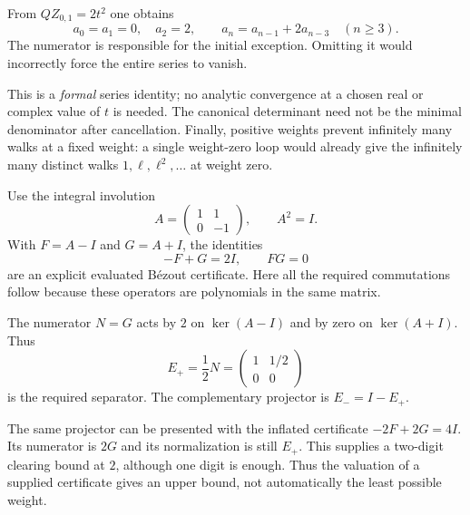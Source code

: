 
From $QZ_{0,1}=2t^2$ one obtains
\[
a_0=a_1=0,\quad a_2=2,\qquad a_n=a_{n-1}+2a_{n-3}\quad(n\ge3).
\]
The numerator is responsible for the initial exception. Omitting it would incorrectly force the entire series to vanish.

This is a \emph{formal} series identity; no analytic convergence at a chosen real or complex value of $t$ is needed. The canonical determinant need not be the minimal denominator after cancellation. Finally, positive weights prevent infinitely many walks at a fixed weight: a single weight-zero loop would already give the infinitely many distinct walks $1,\ell,\ell^2,\ldots$ at weight zero.


Use the integral involution
\[
A=\begin{pmatrix}1&1\\0&-1\end{pmatrix},\qquad A^2=I.
\]
With $F=A-I$ and $G=A+I$, the identities
\[
-F+G=2I,\qquad FG=0
\]
are an explicit evaluated B\'ezout certificate. Here all the required commutations follow because these operators are polynomials in the same matrix.


The numerator $N=G$ acts by $2$ on $\ker(A-I)$ and by zero on $\ker(A+I)$. Thus
\[
E_+=\frac12N
=\begin{pmatrix}1&1/2\\0&0\end{pmatrix}
\]
is the required separator. The complementary projector is $E_-=I-E_+$.

The same projector can be presented with the inflated certificate $-2F+2G=4I$. Its numerator is $2G$ and its normalization is still $E_+$. This supplies a two-digit clearing bound at $2$, although one digit is enough. Thus the valuation of a supplied certificate gives an upper bound, not automatically the least possible weight.

